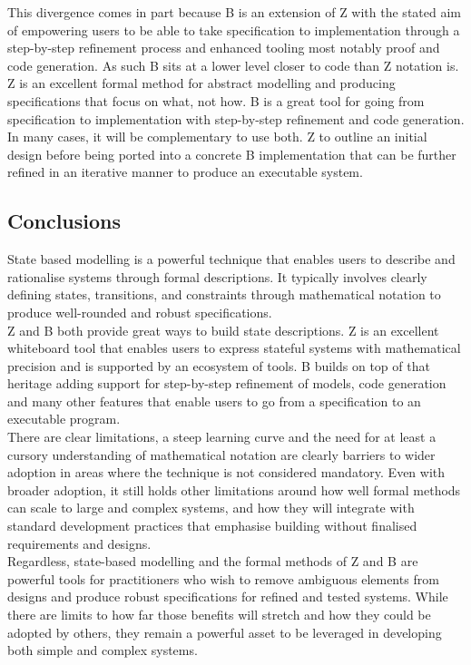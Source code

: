 \documentclass{article}
\begin{document}
\hspace{-0.68cm} This divergence comes in part because B is an extension of Z with the stated aim of empowering users to be able to take specification to implementation through a step-by-step refinement process and enhanced tooling most notably proof and code generation. As such B sits at a lower level closer to code than Z notation is. \\
\newline 
\hspace{-0.68cm} Z is an excellent formal method for abstract modelling and producing specifications that focus on what, not how. B is a great tool for going from specification to implementation with step-by-step refinement and code generation. In many cases, it will be complementary to use both. Z to outline an initial design before being ported into a concrete B implementation that can be further refined in an iterative manner to produce an executable system.
\subsection*{Conclusions}

State based modelling is a powerful technique that enables users to describe and rationalise systems through formal descriptions. It typically involves clearly defining states, transitions, and constraints through mathematical notation to produce well-rounded and robust specifications. \\
\newline
Z and B both provide great ways to build state descriptions. Z is an excellent whiteboard tool that enables users to express stateful systems with mathematical precision and is supported by an ecosystem of tools. B builds on top of that heritage adding support for step-by-step refinement of models, code generation and many other features that enable users to go from a specification to an executable program. \\
\newline
There are clear limitations, a steep learning curve and the need for at least a cursory understanding of mathematical notation are clearly barriers to wider adoption in areas where the technique is not considered mandatory. Even with broader adoption, it still holds other limitations around how well formal methods can scale to large and complex systems, and how they will integrate with standard development practices that emphasise building without finalised requirements and designs. \\
\newline
Regardless, state-based modelling and the formal methods of Z and B are powerful tools for practitioners who wish to remove ambiguous elements from designs and produce robust specifications for refined and tested systems. While there are limits to how far those benefits will stretch and how they could be adopted by others, they remain a powerful asset to be leveraged in developing both simple and complex systems. 
\pagebreak
\end{document}
